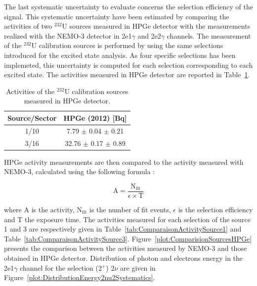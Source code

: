 \documentclass[main.tex]{subfiles}
\begin{document}
\NI The last systematic uncertainty to evaluate concerns the selection efficiency of the signal. This systematic uncertainty have been estimated by comparing the activities of two $^{\text{232}}$U sources measured in HPGe detector with the measurements realized with the NEMO-3 detector in 2e1$\gamma$ and 2e2$\gamma$ channels. The measurement of the $^{\text{232}}$U calibration sources is performed by using the same selections introduced for the excited state analysis. As four specific selections has been implemeted, this uncertainty is computed for each selection corresponding to each excited state. The activities measured in HPGe detector are reported in Table~\ref{tab:HPGeMeasurementU232}.


\begin{table}[h!]
\centering
\begin{tabular}{c|c}
Source/Sector & HPGe (2012) [Bq]   \\[0.1cm]
\hline
1/10          & 7.79  $\pm$ 0.04 $\pm$ 0.21 \\ [0.1cm]
3/16          & 32.76 $\pm$ 0.17 $\pm$ 0.89 \\ [0.1cm]
\hline
\end{tabular}
\caption{Activities of the $^{\text{232}}$U calibration sources measured in HPGe detector.}
\label{tab:HPGeMeasurementU232}
\end{table}  


\bigskip


\NI HPGe activity measurements are then compared to the activity measured with NEMO-3, calculated using the following formula :


\begin{equation}
\text{A} = \frac{\text{N}_{\text{fit}}}{\epsilon \times \text{T}}
\end{equation}


\NI where A is the activity, N$_{\text{fit}}$ is the number of fit events, $\epsilon$ is the selection efficiency and T the exposure time. The activities measured for each selection of the source 1 and 3 are respectively given in Table~\ref{tab:ComparaisonActivitySource1} and Table~\ref{tab:ComparaisonActivitySource3}. Figure~\ref{plot:ComparisionSourcesHPGe} presents the comparison between the activities measured by NEMO-3 and those obtained in HPGe detector. Distribution of photon and electrons energy in the 2e1$\gamma$ channel for the selection (2$^+$) 2$\nu$ are given in Figure~\ref{plot:DistributionEnergy2nu2Systematics}.
\end{document}
